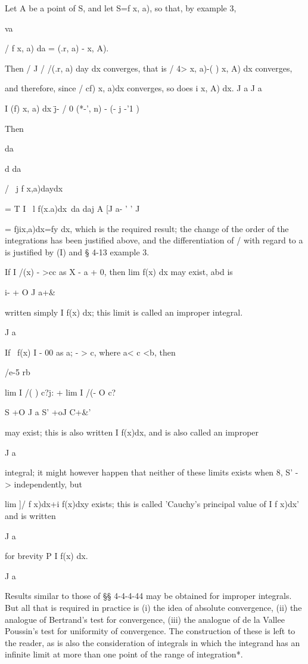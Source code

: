 Let A be a point of S, and let S=f x, a), so that, by example
3,

va

/ f x, a) da = (.r, a) - x, A).

Then / J / /(.r, a) day dx converges, that is / 4> x, a)-( ) x, A) dx
converges,

and therefore, since / cf) x, a)dx converges, so does i x, A) dx. J a
J a

I (f) x, a) dx \=j- / 0 (*-', n) - (- j -'1 ) 

Then

da

d da

/ \ j f x,a)daydx\

= T I \ l f(x.a)dx\ da daj A [J a- ' ' J

= fjix,a)dx=fy dx, which is the required result; the change of the
order of the integrations has been justified above, and the
differentiation of / with regard to a is justified by (I) and §
4-13 example 3.

%
%


If I /(x) - >cc as X - a + 0, then lim f(x) dx may exist, abd is

i- + O J a+\&

written simply I f(x) dx; this limit is called an improper integral.

J a

If \ f(x) I - 00 as a; - > c, where a< c <b, then

/e-5 rb

lim I /( ) c?j: + lim I /(- O c?

S +O J a S' +oJ C+\&'

may exist; this is also written I f(x)dx, and is also called an
improper

J a

integral; it might however happen that neither of these limits exists
when 8, S' - > independently, but

lim ]/ f x)dx+i f(x)dxy exists; this is called 'Cauchy's principal
value of I f x)dx' and is written

J a

for brevity P I f(x) dx.

J a

Results similar to those of §§ 4-4-4-44 may be obtained for improper
integrals. But all that is required in practice is (i) the idea of
absolute convergence, (ii) the analogue of Bertrand's test for
convergence, (iii) the analogue of de la Vallee Poussin's test for
uniformity of convergence. The construction of these is left to the
reader, as is also the consideration of integrals in which the
integrand has an infinite limit at more than one point of the range of
integration*.

